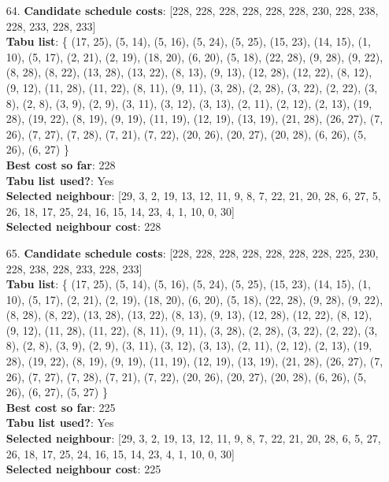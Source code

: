 \documentclass[fleqn]{article}
\begin{document}
\begin{itemize}
    \item[64.] \textbf{Candidate schedule costs}: [228, 228, 228, 228, 228, 228, 230, 228, 238, 228, 233, 228, 233] \\
    \textbf{Tabu list}: \{ (17, 25), (5, 14), (5, 16), (5, 24), (5, 25), (15, 23), (14, 15), (1, 10), (5, 17), (2, 21), (2, 19), (18, 20), (6, 20), (5, 18), (22, 28), (9, 28), (9, 22), (8, 28), (8, 22), (13, 28), (13, 22), (8, 13), (9, 13), (12, 28), (12, 22), (8, 12), (9, 12), (11, 28), (11, 22), (8, 11), (9, 11), (3, 28), (2, 28), (3, 22), (2, 22), (3, 8), (2, 8), (3, 9), (2, 9), (3, 11), (3, 12), (3, 13), (2, 11), (2, 12), (2, 13), (19, 28), (19, 22), (8, 19), (9, 19), (11, 19), (12, 19), (13, 19), (21, 28), (26, 27), (7, 26), (7, 27), (7, 28), (7, 21), (7, 22), (20, 26), (20, 27), (20, 28), (6, 26), (5, 26), (6, 27) \} \\
    \textbf{Best cost so far}: 228 \\
    \textbf{Tabu list used?}: Yes \\
    \textbf{Selected neighbour}: [29, 3, 2, 19, 13, 12, 11, 9, 8, 7, 22, 21, 20, 28, 6, 27, 5, 26, 18, 17, 25, 24, 16, 15, 14, 23, 4, 1, 10, 0, 30] \\
    \textbf{Selected neighbour cost}: 228
      

    \item[65.] \textbf{Candidate schedule costs}: [228, 228, 228, 228, 228, 228, 228, 225, 230, 228, 238, 228, 233, 228, 233] \\
    \textbf{Tabu list}: \{ (17, 25), (5, 14), (5, 16), (5, 24), (5, 25), (15, 23), (14, 15), (1, 10), (5, 17), (2, 21), (2, 19), (18, 20), (6, 20), (5, 18), (22, 28), (9, 28), (9, 22), (8, 28), (8, 22), (13, 28), (13, 22), (8, 13), (9, 13), (12, 28), (12, 22), (8, 12), (9, 12), (11, 28), (11, 22), (8, 11), (9, 11), (3, 28), (2, 28), (3, 22), (2, 22), (3, 8), (2, 8), (3, 9), (2, 9), (3, 11), (3, 12), (3, 13), (2, 11), (2, 12), (2, 13), (19, 28), (19, 22), (8, 19), (9, 19), (11, 19), (12, 19), (13, 19), (21, 28), (26, 27), (7, 26), (7, 27), (7, 28), (7, 21), (7, 22), (20, 26), (20, 27), (20, 28), (6, 26), (5, 26), (6, 27), (5, 27) \} \\
    \textbf{Best cost so far}: 225 \\
    \textbf{Tabu list used?}: Yes \\
    \textbf{Selected neighbour}: [29, 3, 2, 19, 13, 12, 11, 9, 8, 7, 22, 21, 20, 28, 6, 5, 27, 26, 18, 17, 25, 24, 16, 15, 14, 23, 4, 1, 10, 0, 30] \\
    \textbf{Selected neighbour cost}: 225
      


\end{itemize}
\end{document}
